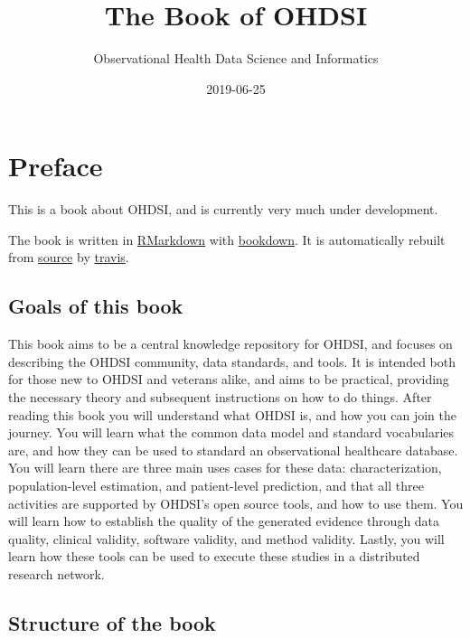 \documentclass[11pt]{book}
\title{The Book of OHDSI}
\author{Observational Health Data Science and Informatics}
\date{2019-06-25}
\begin{document}
\maketitle

{
\setcounter{tocdepth}{1}
\tableofcontents
}
\chapter*{Preface}\label{preface}

 This is a book about OHDSI, and is currently very much under
development.

The book is written in \href{https://rmarkdown.rstudio.com}{RMarkdown}
with \href{https://bookdown.org}{bookdown}. It is automatically rebuilt
from \href{https://github.com/OHDSI/TheBookOfOhdsi}{source} by
\href{http://travis-ci.org/}{travis}.

\section*{Goals of this book}\label{goals-of-this-book}

This book aims to be a central knowledge repository for OHDSI, and
focuses on describing the OHDSI community, data standards, and tools. It
is intended both for those new to OHDSI and veterans alike, and aims to
be practical, providing the necessary theory and subsequent instructions
on how to do things. After reading this book you will understand what
OHDSI is, and how you can join the journey. You will learn what the
common data model and standard vocabularies are, and how they can be
used to standard an observational healthcare database. You will learn
there are three main uses cases for these data: characterization,
population-level estimation, and patient-level prediction, and that all
three activities are supported by OHDSI's open source tools, and how to
use them. You will learn how to establish the quality of the generated
evidence through data quality, clinical validity, software validity, and
method validity. Lastly, you will learn how these tools can be used to
execute these studies in a distributed research network.

\section*{Structure of the book}\label{structure-of-the-book}
\end{document}

